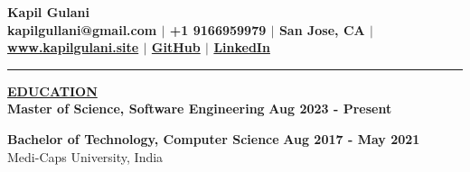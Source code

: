 \documentclass{article}
\begin{document}
\begin{center}
\thispagestyle{empty}
\large \textbf{Kapil Gulani \\}
\normalsize \textbf{kapilgullani@gmail.com $\mid$ +1 9166959979 $\mid$ San Jose, CA  $\mid$ \href{https://kapilgulani.site/}{www.kapilgulani.site} $\mid$ \href{https://github.com/kapilgulani}{GitHub} $\mid$ \href{https://www.linkedin.com/in/kapil-gulani}{LinkedIn} \\}
\rule{\textwidth}{1pt}
\end{center}










\noindent \textbf{\underline{EDUCATION}} \\
\textbf{ Master of Science, Software Engineering } \hfill \textbf{Aug 2023 - Present} \\
\begin{itemize}[noitemsep,nolistsep,leftmargin=*]
\end{itemize}
\begin{itemize}
\end{itemize}
\textbf{Bachelor of Technology, Computer Science} \hfill \hfill \textbf{Aug 2017 - May 2021} \\
Medi-Caps University, India \\

% 
%
\end{document}

